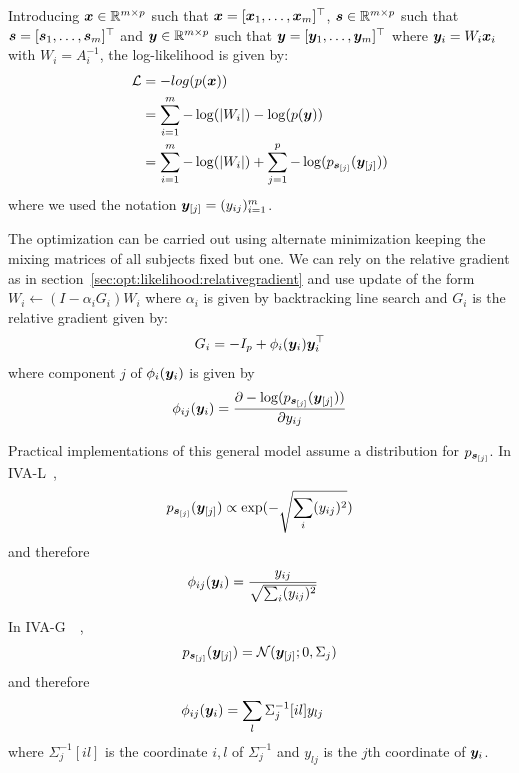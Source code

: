 Introducing $\xb \in \RR^{m \times p}$ such that $\xb  = [\xb_1, \dots, \xb_m]^{\top}$,
$\sbb \in \RR^{m \times p}$ such that $\sbb = [\sbb_1, \dots, \sbb_m]^{\top}$ and $\yb
\in \RR^{m \times p}$ such that $\yb = [\yb_1, \dots, \yb_m]^{\top}$ where $\yb_i = W_i
\xb_i$ with $W_i = A_i^{-1}$, the
log-likelihood is given by:
\begin{align*}
  \loss &= - log(p(\xb)) \\
        &= \sum_{i=1}^m -\log(|W_i|) -\log(p(\yb)) \\
        &= \sum_{i=1}^m - \log(|W_i|) + \sum_{j=1}^p -\log(p_{\sbb_{[j]}}(\yb_{[j]}))
\end{align*}
where we used the notation $\yb_{[j]} = (y_{ij})_{i=1}^m$.

The optimization can be carried out using alternate minimization keeping the
mixing matrices of all subjects fixed but one. We can rely on the relative
gradient as in section~\ref{sec:opt:likelihood:relativegradient} and use update
of the form $W_i \leftarrow (I - \alpha_i G_i) W_i$ where $\alpha_i$ is given by
backtracking line search and $G_i$ is the relative gradient given by:
\begin{align}
  G_i = -I_p + \phi_i(\yb_i) \yb_i^{\top}
\end{align}
where component $j$ of $\phi_i(\yb_i)$ is given by
\begin{align}
  \phi_{ij}(\yb_i) = \partialfrac{y_{ij}}{-\log(p_{\sbb_{[j]}}(\yb_{[j]}))}
\end{align}

Practical implementations of this general model assume a distribution for
$p_{\sbb_{[j]}}$.
In IVA-L~\cite{lee2008independent},
\begin{align}
  p_{\sbb_{[j]}}(\yb_{[j]}) \propto \exp(-\sqrt{\sum_i (y_{ij})^2})
\end{align}
and therefore
\begin{align}
  \phi_{ij}(\yb_i) &= \frac{y_{ij}}{\sqrt{\sum_i (y_{ij})^2}}
\end{align}

In IVA-G~\cite{anderson2011joint}~\cite{via2011maximum},
\begin{align}
  p_{\sbb_{[j]}}(\yb_{[j]}) = \Ncal( \yb_{[j]}; 0, \Sigma_j)
\end{align}
and therefore
\begin{align}
  \phi_{ij}(\yb_i) &= \sum_l \Sigma_j^{-1}[il] y_{lj}
\end{align}
where  $\Sigma_j^{-1}[il]$ is the coordinate $i, l$ of $\Sigma_j^{-1}$ and
$y_{lj}$ is the $j$th coordinate of $\yb_i$.

